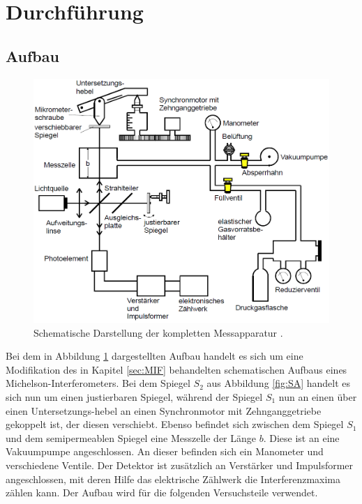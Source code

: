 
\section{Durchführung}
\label{sec:Durchführung}
\subsection{Aufbau}
\label{sec:Aufbau}

\begin{figure}[H]
  \centering
  \includegraphics[width=\linewidth-30pt,height=\textheight-30pt,keepaspectratio]{Text/Bilder/Aufbau.png}
  \caption{Schematische Darstellung der kompletten Messapparatur \cite[13]{sample}.}
  \label{fig:aufbau}
\end{figure}

Bei dem in Abbildung \ref{fig:aufbau} dargestellten Aufbau handelt es sich um eine Modifikation des in Kapitel \ref{sec:MIF} behandelten
schematischen Aufbaus eines Michelson-Interferometers.
Bei dem Spiegel $S_2$ aus Abbildung \ref{fig:SA} handelt es sich nun um einen justierbaren Spiegel, während der Spiegel $S_1$ nun an einen über einen Untersetzungs-hebel an einen
Synchronmotor mit Zehnganggetriebe gekoppelt ist, der diesen verschiebt. Ebenso befindet sich zwischen dem Spiegel $S_1$ und dem semipermeablen Spiegel eine Messzelle der Länge $b$.
Diese ist an eine Vakuumpumpe angeschlossen. An dieser befinden sich ein Manometer und verschiedene Ventile.
Der Detektor ist zusätzlich an Verstärker und Impulsformer angeschlossen, mit deren Hilfe das elektrische Zählwerk die Interferenzmaxima zählen kann.
Der Aufbau wird für die folgenden Versuchsteile verwendet.

